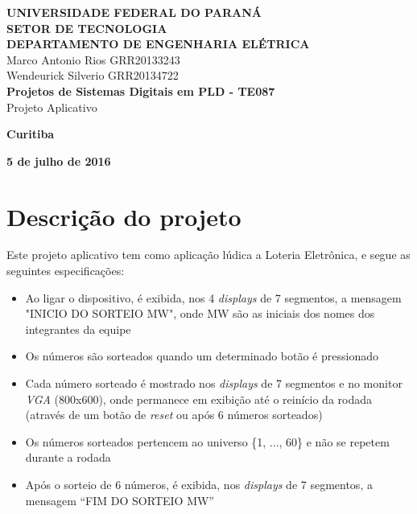 \documentclass[12pt]{article}
\begin{document}
    
\begin{titlepage}
 \vfill
  \begin{center}
   {\large \textbf{UNIVERSIDADE FEDERAL DO PARANÁ \\ SETOR DE TECNOLOGIA \\ DEPARTAMENTO DE ENGENHARIA ELÉTRICA}} \\[5cm]

  {\large {Marco Antonio Rios  GRR20133243 \\ Wendeurick Silverio GRR20134722} }\\[4cm]


   {\Large \textbf{Projetos de Sistemas Digitais em PLD - TE087} \\ Projeto Aplicativo}\\[6cm]
    \vfill

    \vspace{2cm}

    \large \textbf{Curitiba}

    \large \textbf{5 de julho de 2016}

      \end{center}
\end{titlepage}

\clearpage
\tableofcontents    
\clearpage
\section{Descrição do projeto}
Este projeto aplicativo tem como aplicação lúdica a Loteria Eletrônica, e segue as seguintes especificações:

\begin{itemize}
    \item Ao ligar o dispositivo, é exibida, nos 4 \emph{displays} de 7 segmentos, a mensagem "INICIO DO SORTEIO MW", onde MW são as iniciais dos nomes dos integrantes da equipe
    \item Os números são sorteados quando um determinado botão é pressionado
    \item Cada número sorteado é mostrado nos \emph{displays} de 7 segmentos e no monitor \emph{VGA} (800x600), onde permanece em exibição até o reinício da rodada (através de um botão de \emph{reset} ou após 6 números sorteados)
    \item Os números sorteados pertencem ao universo \{1, ..., 60\} e não se repetem durante a rodada
    \item Após o sorteio de 6 números, é exibida, nos \emph{displays} de 7 segmentos, a mensagem “FIM DO SORTEIO MW”
\end{itemize}
\end{document}
